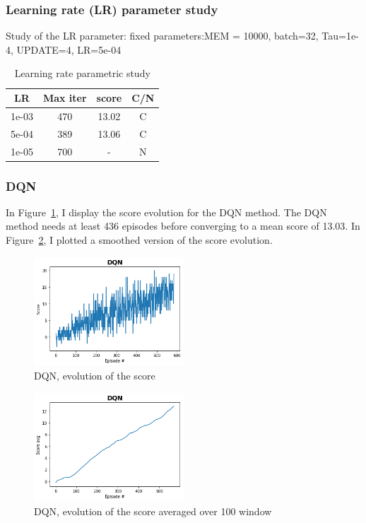 \documentclass[12pt]{article}
\begin{document}
\subsubsection{Learning rate (LR) parameter study}
Study of the LR parameter:
fixed parameters:MEM = 10000, batch=32, Tau=1e-4, UPDATE=4, LR=5e-04

\begin{table}[H]
\centering
\begin{tabular}{|c|c|c|c|}
\hline
{\textbf{LR}} & {\textbf{Max iter}} & {\textbf{score}} & {\textbf{C/N}} \\ \hline
1e-03  & 470 & 13.02 & C \\ \hline
5e-04  & 389 & 13.06 & C \\ \hline
1e-05  & 700 &   -   & N \\ \hline
\end{tabular}
\caption{Learning rate parametric study}
\label{table:LR}
\end{table}


\subsubsection{DQN}
In Figure~\ref{fig:DQN}, I display the score evolution for the DQN method. The DQN method needs at least 436 episodes before converging to a mean score of 13.03.  In Figure~\ref{fig:DQN_smooth}, I plotted a smoothed version of the score evolution.

\begin{figure}[H]
  \centering
  \includegraphics[width=0.5\textwidth]{../PNG/dqn.png}
  \caption{DQN, evolution of the score}
  \label{fig:DQN}
\end{figure}

\begin{figure}[H]
 \centering
  \includegraphics[width=0.5\textwidth]{../PNG/dqn_smooth.png}
  \caption{DQN, evolution of the score averaged over 100 window}
  \label{fig:DQN_smooth}
\end{figure}
\end{document}
